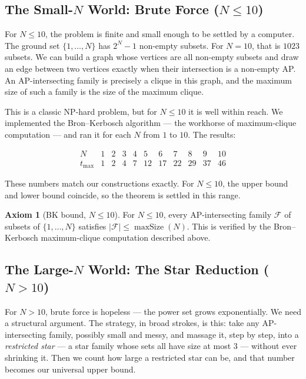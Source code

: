 \documentclass[11pt,a4paper]{article}
\theoremstyle{definition}
\newtheorem{axiom}[theorem]{Axiom}
\newcommand{\ground}{\{1,\dots,N\}}
\begin{document}
\subsection{The Small-$N$ World: Brute Force ($N \leq 10$)}

For $N \leq 10$, the problem is finite and small enough to be settled by a computer.
The ground set $\{1,\dots,N\}$ has $2^N - 1$ non-empty subsets. For $N=10$, that is
$1023$ subsets. We can build a graph whose vertices are all non-empty subsets and
draw an edge between two vertices exactly when their intersection is a non-empty AP.
An AP-intersecting family is precisely a clique in this graph, and the maximum size
of such a family is the size of the maximum clique.

This is a classic NP-hard problem, but for $N \leq 10$ it is well within reach. We
implemented the Bron--Kerbosch algorithm --- the workhorse of maximum-clique
computation --- and ran it for each $N$ from $1$ to $10$. The results:

\[
\begin{array}{c|cccccccccc}
N      & 1 & 2 & 3 & 4 & 5  & 6  & 7  & 8  & 9  & 10 \\ \hline
t_{\max} & 1 & 2 & 4 & 7 & 12 & 17 & 22 & 29 & 37 & 46
\end{array}
\]

These numbers match our constructions exactly. For $N \leq 10$, the upper bound and
lower bound coincide, so the theorem is settled in this range.

\begin{axiom}[BK bound, $N \leq 10$]\label{ax:bk}
For $N \leq 10$, every AP-intersecting family $\mathcal{F}$ of subsets of $\ground$
satisfies $|\mathcal{F}| \leq \operatorname{maxSize}(N)$. This is verified by the
Bron--Kerbosch maximum-clique computation described above.
\end{axiom}

\subsection{The Large-$N$ World: The Star Reduction ($N > 10$)}

For $N > 10$, brute force is hopeless --- the power set grows exponentially. We need
a structural argument. The strategy, in broad strokes, is this: take any
AP-intersecting family, possibly small and messy, and massage it, step by step, into
a \emph{restricted star} --- a star family whose sets all have size at most $3$ ---
without ever shrinking it. Then we count how large a restricted star can be, and
that number becomes our universal upper bound.
\end{document}
